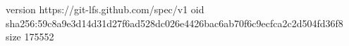 version https://git-lfs.github.com/spec/v1
oid sha256:59c8a9e3d14d31d27f6ad528dc026e4426bac6ab70f6c9ecfca2c2d504fd36f8
size 175552
